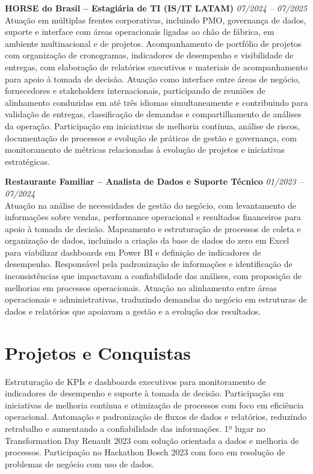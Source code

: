\documentclass[11pt,a4paper]{article}
\newcommand{\experience}[3]{%
  \textbf{#1} \hfill \textit{#2}\\[4pt]
  #3
  \vspace{8pt}
}
\begin{document}
\experience{HORSE do Brasil -- Estagiária de TI (IS/IT LATAM)}{07/2024 -- 07/2025}{%
Atuação em múltiplas frentes corporativas, incluindo PMO, governança de dados, suporte e interface com áreas operacionais ligadas ao chão de fábrica, em ambiente multinacional e de projetos. Acompanhamento de portfólio de projetos com organização de cronogramas, indicadores de desempenho e visibilidade de entregas, com elaboração de relatórios executivos e materiais de acompanhamento para apoio à tomada de decisão. Atuação como interface entre áreas de negócio, fornecedores e stakeholders internacionais, participando de reuniões de alinhamento conduzidas em até três idiomas simultaneamente e contribuindo para validação de entregas, classificação de demandas e compartilhamento de análises da operação. Participação em iniciativas de melhoria contínua, análise de riscos, documentação de processos e evolução de práticas de gestão e governança, com monitoramento de métricas relacionadas à evolução de projetos e iniciativas estratégicas.}

\experience{Restaurante Familiar -- Analista de Dados e Suporte Técnico}{01/2023 -- 07/2024}{%
Atuação na análise de necessidades de gestão do negócio, com levantamento de informações sobre vendas, performance operacional e resultados financeiros para apoio à tomada de decisão. Mapeamento e estruturação de processos de coleta e organização de dados, incluindo a criação da base de dados do zero em Excel para viabilizar dashboards em Power BI e definição de indicadores de desempenho. Responsável pela padronização de informações e identificação de inconsistências que impactavam a confiabilidade das análises, com proposição de melhorias em processos operacionais. Atuação no alinhamento entre áreas operacionais e administrativas, traduzindo demandas do negócio em estruturas de dados e relatórios que apoiavam a gestão e a evolução dos resultados.}

\section*{Projetos e Conquistas}

Estruturação de KPIs e dashboards executivos para monitoramento de indicadores de desempenho e suporte à tomada de decisão. Participação em iniciativas de melhoria contínua e otimização de processos com foco em eficiência operacional. Automação e padronização de fluxos de dados e relatórios, reduzindo retrabalho e aumentando a confiabilidade das informações. 1º lugar no Transformation Day Renault 2023 com solução orientada a dados e melhoria de processos. Participação no Hackathon Bosch 2023 com foco em resolução de problemas de negócio com uso de dados.
\end{document}

